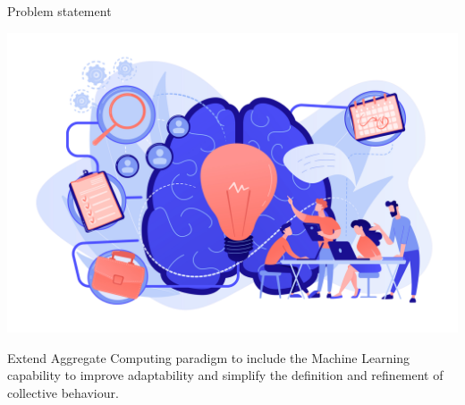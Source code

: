 \begin{frame}{Problem statement}
  \begin{backgroundblock} 
    \includegraphics[width=\paperwidth]{img/problem-statement.jpg} 
  \end{backgroundblock} 
  \centering
  \begin{card}
    {
      \color{accent}
      Extend Aggregate Computing paradigm to include the Machine Learning capability to improve adaptability and simplify the definition and refinement of collective behaviour.
    }
  \end{card}
\end{frame}